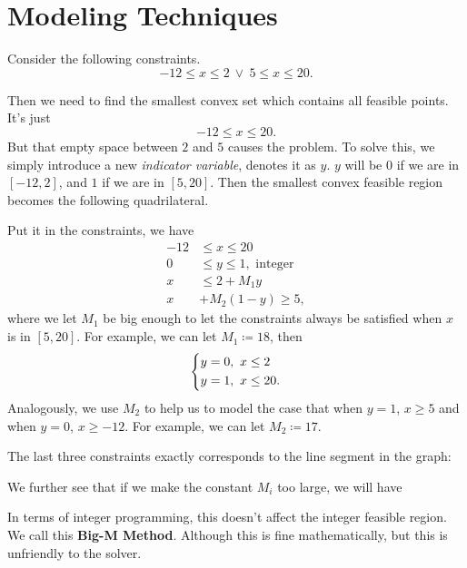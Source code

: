 \section{Modeling Techniques}
\begin{eg}
	Consider the following constraints.
	\[
		-12\leq x\leq 2\ \lor\ 5\leq x\leq 20.
	\]
	\begin{figure}[H]
		\centering
		\label{fig:integer-programming-eg1}
	\end{figure}
	Then we need to find the smallest convex set which contains all feasible points. It's just
	\[
		-12\leq x\leq 20.
	\]
	But that empty space between \(2\) and \(5\) causes the problem. To solve this, we simply introduce a new \emph{indicator variable}, denotes
	it as \(y\). \(y\) will be \(0\) if we are in \([-12, 2]\), and \(1\) if we are in \([5, 20]\). Then the smallest convex feasible region becomes
	the following quadrilateral.
	\begin{figure}[H]
		\centering
		\label{fig:integer-programming-eg1.2}
	\end{figure}
	Put it in the constraints, we have
	\[
		\begin{split}
			-12&\leq x\leq 20\\
			0&\leq y\leq 1, \text{ integer}\\
			x&\leq 2+M_1 y\\
			x&+M_2(1 - y)\geq 5,
		\end{split}
	\]
	where we let \(M_1\) be big enough to let the constraints always be satisfied when \(x\) is in \([5, 20]\). For example, we can let \(M_1\coloneqq 18\),
	then
	\[
		\begin{dcases}
			y = 0,\ x\leq 2 \\
			y = 1,\ x\leq 20.
		\end{dcases}
	\]
	Analogously, we use \(M_2\) to help us to model the case that when \(y = 1\), \(x\geq 5\) and when \(y = 0\), \(x\geq -12\). For example, we can let
	\(M_2 \coloneqq 17\).

	The last three constraints exactly corresponds to the line segment in the graph:
	\begin{figure}[H]
		\centering
		\label{fig:integer-programming-eg1.3}
	\end{figure}

	We further see that if we make the constant \(M_{i}\) too large, we will have
	\begin{figure}[H]
		\centering
		\label{fig:integer-programming-eg1.4}
	\end{figure}
	In terms of integer programming, this doesn't affect the integer feasible region. We call this \textbf{Big-M Method}. Although
	this is fine mathematically, but this is unfriendly to the solver.
\end{eg}

